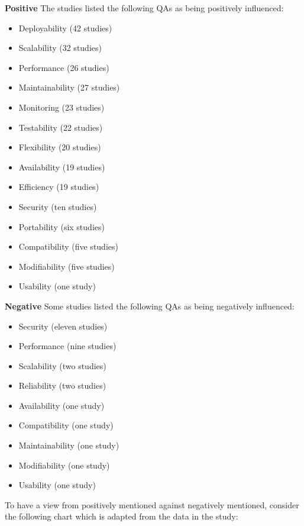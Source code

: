 \textbf{Positive}
The studies listed the following QAs as being positively influenced:
\begin{itemize}
    \item Deployability (42 studies)
    \item Scalability (32 studies)
    \item Performance (26 studies)
    \item Maintainability (27 studies)
    \item Monitoring (23 studies)
    \item Testability (22 studies)
    \item Flexibility (20 studies)
    \item Availability (19 studies)
    \item Efficiency (19 studies)
    \item Security (ten studies)
    \item Portability (six studies)
    \item Compatibility (five studies)
    \item Modifiability (five studies)
    \item Usability (one study)
\end{itemize}

\textbf{Negative}
Some studies listed the following QAs as being negatively influenced:
\begin{itemize}
    \item Security (eleven studies)
    \item Performance (nine studies)
    \item Scalability (two studies)
    \item Reliability (two studies)
    \item Availability (one study)
    \item Compatibility (one study)
    \item Maintainability (one study)
    \item Modifiability (one study)
    \item Usability (one study)
\end{itemize}

To have a view from positively mentioned against negatively mentioned,
consider the following chart which is adapted from the data in the study:

